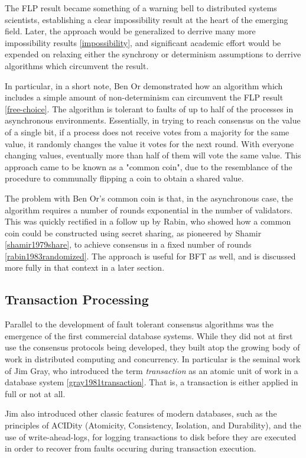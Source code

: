 The FLP result became something of a warning bell to distributed systems scientists, 
establishing a clear impossibility result at the heart of the emerging field.
Later, the approach would be generalized to derrive many more impossibility results \ref{impossibility},
and significant academic effort would be expended on relaxing either the synchrony or determinism assumptions to derrive algorithms which circumvent the result.

In particular, in a short note, 
Ben Or demonstrated how an algorithm which includes a simple amount of non-determinism can circumvent the FLP result \ref{free-choice}.
The algorithm is tolerant to faults of up to half of the processes in asynchronous environments.
Essentially, in trying to reach consensus on the value of a single bit, 
if a process does not receive votes from a majority for the same value, it randomly changes the value it votes for the next round.
With everyone changing values, eventually more than half of them will vote the same value.
This approach came to be known as a "common coin", 
due to the resemblance of the procedure to communally flipping a coin to obtain a shared value.

The problem with Ben Or's common coin is that, in the asynchronous case,
the algorithm requires a number of rounds exponential in the number of validators.
This was quickly rectified in a follow up by Rabin, who showed how a common coin
could be constructed using secret sharing, as pioneered by Shamir \ref{shamir1979share},
to achieve consensus in a fixed number of rounds \ref{rabin1983randomized}.
The approach is useful for BFT as well, and is discussed more fully in that context in a later section.

\subsection{Transaction Processing}

Parallel to the development of fault tolerant consensus algorithms was the emergence of the first commercial database systems.
While they did not at first use the consensus protocols being developed, 
they built atop the growing body of work in distributed computing and concurrency.
In particular is the seminal work of Jim Gray, who introduced the term \emph{transaction} 
as an atomic unit of work in a database system \ref{gray1981transaction}. 
That is, a transaction is either applied in full or not at all.

Jim also introduced other classic features of modern databases,
such as the principles of ACIDity (Atomicity, Consistency, Isolation, and Durability),
and the use of write-ahead-logs, for logging transactions to disk before they are executed
in order to recover from faults occuring during transaction execution.



